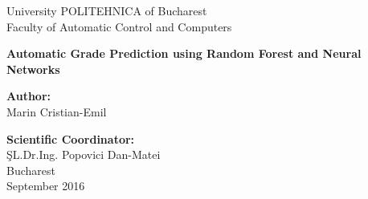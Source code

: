 \thispagestyle{empty}
\begin{center}
\large
University POLITEHNICA of Bucharest \\
Faculty of Automatic Control and Computers \\

{\LARGE
	\textbf{Automatic Grade Prediction using Random Forest and Neural Networks}
}

\vspace{3cm}
\textbf{Author:}\\
Marin Cristian-Emil

\bigskip
\bigskip

\textbf{Scientific Coordinator:}\\
ŞL.Dr.Ing. Popovici Dan-Matei\\

Bucharest\\
September 2016 \\
\vspace*{1cm}
\end{center}
